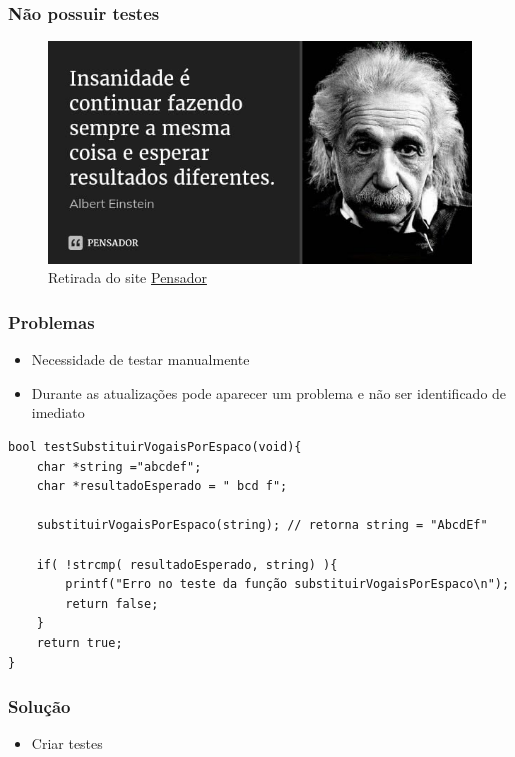 \begin{frame}
	\frametitle{Não possuir testes}

	\begin{figure}[h]
		\centering
			\includegraphics[height=0.6\paperheight]{figuras/albert}
		\caption{Retirada do site \href{https://www.pensador.com/frase/NjY1NDYw/}{Pensador}}\label{figure:albert}
	\end{figure}

\end{frame}

\begin{frame}
	\frametitle{Problemas}

	\begin{itemize}
		\item Necessidade de testar manualmente
		\item Durante as atualizações pode aparecer um problema e não ser identificado de imediato
	\end{itemize}

\end{frame}


\begin{frame}[fragile]

	\begin{listing}[H]
		\begin{verbatim}
bool testSubstituirVogaisPorEspaco(void){
    char *string ="abcdef";
    char *resultadoEsperado = " bcd f";

    substituirVogaisPorEspaco(string); // retorna string = "AbcdEf"

    if( !strcmp( resultadoEsperado, string) ){
        printf("Erro no teste da função substituirVogaisPorEspaco\n");
        return false;
    }
    return true;
}
		\end{verbatim}
	\end{listing}

\end{frame}

\begin{frame}
	\frametitle{Solução}

	\begin{itemize}
		\item Criar testes
	\end{itemize}

\end{frame}
